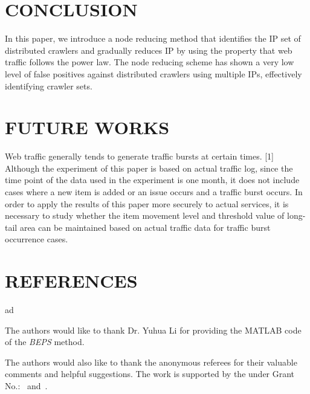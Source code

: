 %
%
\section{CONCLUSION}
In this paper, we introduce a node reducing method that identifies the IP set of distributed crawlers and gradually reduces IP by using the property that web traffic follows the power law.
The node reducing scheme has shown a very low level of false positives against distributed crawlers using multiple IPs, effectively identifying crawler sets.



%
%
\section{FUTURE WORKS}
Web traffic generally tends to generate traffic bursts at certain times. [1] Although the experiment of this paper is based on actual traffic log, since the time point of the data used in the experiment is one month, it does not include cases where a new item is added or an issue occurs and a traffic burst occurs.
In order to apply the results of this paper more securely to actual services, it is necessary to study whether the item movement level and threshold value of long-tail area can be maintained based on actual traffic data for traffic burst occurrence cases.



%
%
\section{REFERENCES}
ad

\begin{acks}
  The authors would like to thank Dr. Yuhua Li for providing the
  MATLAB code of the \textit{BEPS} method.

  The authors would also like to thank the anonymous referees for
  their valuable comments and helpful suggestions. The work is
  supported by the  under Grant
  No.:~
  and~.
\end{acks}


